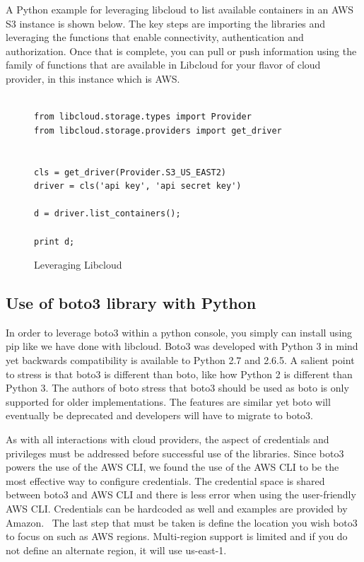 A Python example for leveraging libcloud to list available containers in an AWS S3 
instance is shown below. The key steps are importing the libraries and leveraging the
functions that enable connectivity, authentication and authorization. Once that is 
complete, you can pull or push information using the family of functions that are 
available in Libcloud for your flavor of cloud provider, in this instance which is AWS.

\begin{figure}[htb]

\begin{verbatim}

from libcloud.storage.types import Provider
from libcloud.storage.providers import get_driver


cls = get_driver(Provider.S3_US_EAST2)
driver = cls('api key', 'api secret key')

d = driver.list_containers();

print d;

\end{verbatim}

\caption{Leveraging Libcloud \cite{hid-sp18-518-LibCloud}}\label{c:libcloud-example}

\end{figure}
 
\subsection{Use of boto3 library with Python}

In order to leverage boto3 within a python console, you simply can install using pip like 
we have done with libcloud. Boto3 was developed with Python 3 in mind yet backwards 
compatibility is available to Python 2.7 and 2.6.5. A salient point to stress is that
boto3 is different than boto, like how Python 2 is different than Python 3. The authors 
of boto stress that boto3 should be used as boto is only supported for older 
implementations. The features are similar yet boto will eventually be deprecated and 
developers will have to migrate to boto3.~\cite{hid-sp18-518-AWS-boto3}

As with all interactions with cloud providers, the aspect of credentials and privileges 
must be addressed before successful use of the libraries. Since boto3 powers the use of
the AWS CLI, we found the use of the AWS CLI to be the most effective way to configure 
credentials. The credential space is shared between boto3 and AWS CLI and there is less 
error when using the user-friendly AWS CLI. Credentials can be hardcoded as well and 
examples are provided by Amazon.~\cite{hid-sp18-518-Boto3} The last step that must be 
taken is define the location you wish boto3 to focus on such as AWS regions. Multi-region 
support is limited and if you do not define an alternate region, it will use us-east-1.

